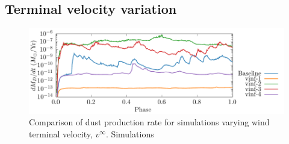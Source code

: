 \subsection{Terminal velocity variation}
\label{sec:paper1vinfresults}

\begin{figure}
  \centering
  \includegraphics{assets/vinf-results/vinf-phase-dust_rate.pdf}
  \caption[]{Comparison of dust production rate for simulations varying wind terminal velocity, $v^\infty$. Simulations }
  \label{fig:vinfdustproduction}
\end{figure}

